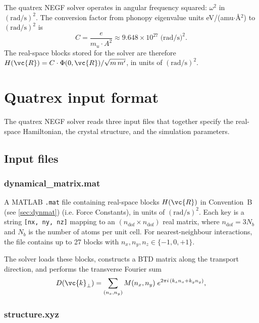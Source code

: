 The quatrex NEGF solver operates in angular frequency squared:
$\omega^2$ in $(\mathrm{rad/s})^2$.  The conversion factor from
phonopy eigenvalue units eV/(amu$\cdot$\AA$^2$) to $(\mathrm{rad/s})^2$
is
\begin{equation}\label{eq:conversion}
  C = \frac{e}{m_u \cdot A^2}
  \approx 9.648 \times 10^{27}\;\text{(rad/s)}^2.
\end{equation}
The real-space blocks stored for the solver are therefore
$H(\vc{R}) = C \cdot \Phi(0,\vc{R}) / \sqrt{m\,m'}$, in units of
$(\mathrm{rad/s})^2$.


\section{Quatrex input format}
\label{sec:quatrex_input}

The quatrex NEGF solver reads three input files that together specify
the real-space Hamiltonian, the crystal structure, and the simulation
parameters.


\subsection{Input files}
\label{sec:input_files}

\subsubsection{dynamical\_matrix.mat}

A MATLAB \texttt{.mat} file containing real-space blocks $H(\vc{R})$
in Convention~B (see \cref{sec:dynmat}) (i.e. Force Constants), in units of $(\mathrm{rad/s})^2$.  Each key is a
string \texttt{[nx, ny, nz]} mapping to an
$(n_\mathrm{dof} \times n_\mathrm{dof})$ real matrix, where
$n_\mathrm{dof} = 3N_b$ and $N_b$ is the number of atoms per unit
cell.  For nearest-neighbour interactions, the file contains up to 27
blocks with $n_x, n_y, n_z \in \{-1, 0, +1\}$.

The solver loads these blocks, constructs a BTD matrix along the
transport direction, and performs the transverse Fourier sum
\begin{equation}
  D(\vc{k}_\perp)
  = \sum_{(n_x, n_y)} M(n_x, n_y)\;
    e^{2\pi i\,(k_x n_x + k_y n_y)},
\end{equation}

\subsubsection{structure.xyz}

